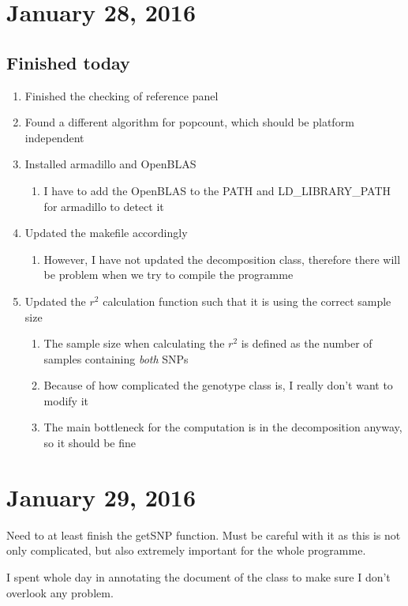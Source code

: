 \documentclass[12pt]{article}
\begin{document}
	\section*{January 28, 2016}
	\subsection{Finished today}
	\begin{enumerate}
		\item Finished the checking of reference panel
		\item Found a different algorithm for popcount, which should be platform independent
		\item Installed armadillo and OpenBLAS
		\begin{enumerate}
			\item I have to add the OpenBLAS to the PATH and LD\_LIBRARY\_PATH for armadillo to detect it
		\end{enumerate}
		\item Updated the makefile accordingly
		\begin{enumerate}
			\item However, I have not updated the decomposition class, therefore there will be problem when we try to compile the programme
		\end{enumerate}
		\item Updated the $r^2$ calculation function such that it is using the correct sample size
		\begin{enumerate}
			\item The sample size when calculating the $r^2$ is defined as the number of samples containing \emph{both} SNPs
			\item Because of how complicated the genotype class is, I really don't want to modify it
			\item The main bottleneck for the computation is in the decomposition anyway, so it should be fine
		\end{enumerate}
		
	\end{enumerate}
	
	\section*{January 29, 2016}
	Need to at least finish the getSNP function.
	Must be careful with it as this is not only complicated, but also extremely important for the whole programme.
	
	I spent whole day in annotating the document of the class to make sure I don't overlook any problem.
	
\end{document}
